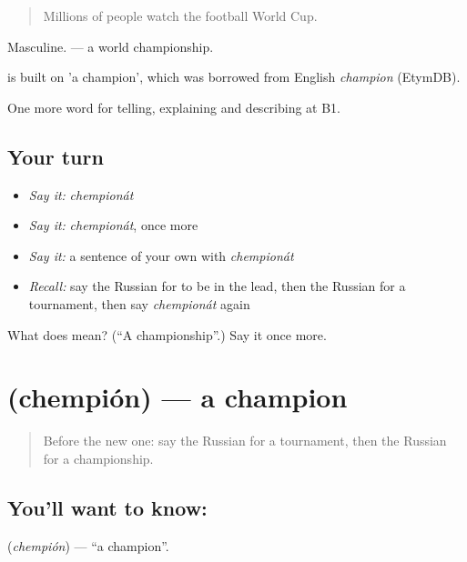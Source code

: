 \begin{quote}
Millions of people watch the football World Cup.
\end{quote}

Masculine. \emph{ } — a world championship.

\begin{cousinweb}
\emph{} is built on \emph{} 'a champion', which was borrowed from English \emph{champion} (EtymDB).
\end{cousinweb}

\begin{grammarlens}[title={What you've built}]
One more word for telling, explaining and describing at B1.
\end{grammarlens}

\subsection*{Your turn}
\begin{itemize}
\raggedright
  \item \emph{Say it:} \emph{chempionát}
  \item \emph{Say it:} \emph{chempionát}, once more
  \item \emph{Say it:} a sentence of your own with \emph{chempionát}
  \item \emph{Recall:} say the Russian for to be in the lead, then the Russian for a tournament, then say \emph{chempionát} again
\end{itemize}

\begin{tcolorbox}[breakable,colback=teal!4,colframe=teal!35!black,title={Before you move on}]
What does  mean? (\textquotedblleft{}A championship\textquotedblright{}.) Say it once more.
\end{tcolorbox}
\section[\texorpdfstring{\ru{чемпион} (chempión)}{чемпион (chempión)}]{ (chempión) — a champion}

\label{lesson:RU-C511-chempion}



\begin{quote}
Before the new one: say the Russian for a tournament, then the Russian for a championship.
\end{quote}

\subsection*{You'll want to know: }
\textbf{} (\emph{chempión}) — \textquotedblleft{}a champion\textquotedblright{}.

